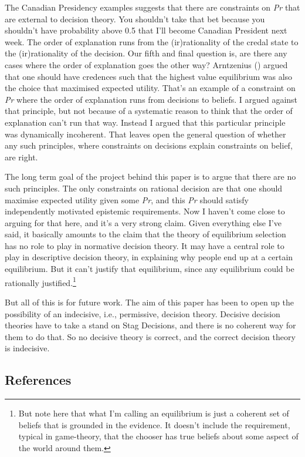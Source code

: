 \documentclass[
  11pt,
  letterpaper,
  DIV=11,
  numbers=noendperiod,
  twoside]{scrartcl}
\begin{document}
The Canadian Presidency examples suggests that there are constraints on
\emph{Pr} that are external to decision theory. You shouldn't take that
bet because you shouldn't have probability above 0.5 that I'll become
Canadian President next week. The order of explanation runs from the
(ir)rationality of the credal state to the (ir)rationality of the
decision. Our fifth and final question is, are there any cases where the
order of explanation goes the other way? Arntzenius
() argued that one should have
credences such that the highest value equilibrium was also the choice
that maximised expected utility. That's an example of a constraint on
\emph{Pr} where the order of explanation runs from decisions to beliefs.
I argued against that principle, but not because of a systematic reason
to think that the order of explanation can't run that way. Instead I
argued that this particular principle was dynamically incoherent. That
leaves open the general question of whether any such principles, where
constraints on decisions explain constraints on belief, are right.

The long term goal of the project behind this paper is to argue that
there are no such principles. The only constraints on rational decision
are that one should maximise expected utility given some \emph{Pr}, and
this \emph{Pr} should satisfy independently motivated epistemic
requirements. Now I haven't come close to arguing for that here, and
it's a very strong claim. Given everything else I've said, it basically
amounts to the claim that the theory of equilibrium selection has no
role to play in normative decision theory. It may have a central role to
play in descriptive decision theory, in explaining why people end up at
a certain equilibrium. But it can't justify that equilibrium, since any
equilibrium could be rationally justified.\footnote{But note here that
  what I'm calling an equilibrium is just a coherent set of beliefs that
  is grounded in the evidence. It doesn't include the requirement,
  typical in game-theory, that the chooser has true beliefs about some
  aspect of the world around them.}

But all of this is for future work. The aim of this paper has been to
open up the possibility of an indecisive, i.e., permissive, decision
theory. Decisive decision theories have to take a stand on Stag
Decisions, and there is no coherent way for them to do that. So no
decisive theory is correct, and the correct decision theory is
indecisive.

\subsection*{References}\label{references}
\end{document}
